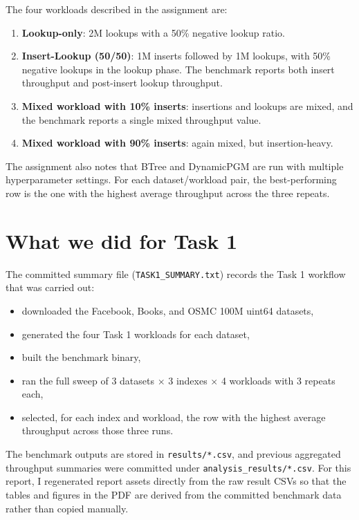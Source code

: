 \documentclass[11pt]{article}
\begin{document}
The four workloads described in the assignment are:
\begin{enumerate}[leftmargin=1.5em]
    \item \textbf{Lookup-only}: 2M lookups with a 50\% negative lookup ratio.
    \item \textbf{Insert-Lookup (50/50)}: 1M inserts followed by 1M lookups, with
    50\% negative lookups in the lookup phase. The benchmark reports both insert
    throughput and post-insert lookup throughput.
    \item \textbf{Mixed workload with 10\% inserts}: insertions and lookups are mixed,
    and the benchmark reports a single mixed throughput value.
    \item \textbf{Mixed workload with 90\% inserts}: again mixed, but insertion-heavy.
\end{enumerate}

The assignment also notes that BTree and DynamicPGM are run with multiple
hyperparameter settings. For each dataset/workload pair, the best-performing row is the
one with the highest average throughput across the three repeats.

\section{What we did for Task 1}

The committed summary file (\texttt{TASK1\_SUMMARY.txt}) records the Task 1 workflow that
was carried out:
\begin{itemize}[leftmargin=1.5em]
    \item downloaded the Facebook, Books, and OSMC 100M uint64 datasets,
    \item generated the four Task 1 workloads for each dataset,
    \item built the benchmark binary,
    \item ran the full sweep of 3 datasets $\times$ 3 indexes $\times$ 4 workloads with
    3 repeats each,
    \item selected, for each index and workload, the row with the highest average
    throughput across those three runs.
\end{itemize}

The benchmark outputs are stored in \texttt{results/*.csv}, and previous aggregated
throughput summaries were committed under \texttt{analysis\_results/*.csv}. For this
report, I regenerated report assets directly from the raw result CSVs so that the tables
and figures in the PDF are derived from the committed benchmark data rather than copied
manually.
\end{document}
